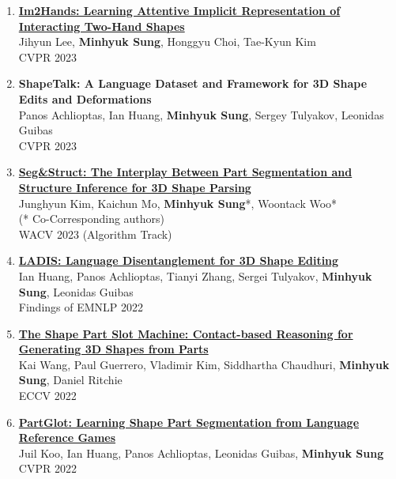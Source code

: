 \documentclass[letterpaper,10pt]{article} %
\newcommand{\blankline}{\quad\pagebreak[2]}
\begin{document}
\begin{enumerate}
\item \label{cvpr23_2}
\href{https://arxiv.org/abs/2302.14348}{\textbf{Im2Hands: Learning Attentive Implicit Representation of Interacting Two-Hand Shapes}}\\
Jihyun Lee, \textbf{Minhyuk Sung}, Honggyu Choi, Tae-Kyun Kim\\
CVPR 2023\\
\blankline

\item \label{cvpr23_1}
\textbf{ShapeTalk: A Language Dataset and Framework for 3D Shape Edits and Deformations}\\
Panos Achlioptas, Ian Huang, \textbf{Minhyuk Sung}, Sergey Tulyakov, Leonidas Guibas\\
CVPR 2023\\
\blankline

\item \label{wacv23}
\href{https://arxiv.org/abs/2212.05011}{\textbf{Seg\&Struct: The Interplay Between Part Segmentation and Structure Inference for 3D Shape Parsing}}\\
Junghyun Kim, Kaichun Mo, \textbf{Minhyuk Sung}*, Woontack Woo*\\
(* Co-Corresponding authors)\\
WACV 2023 (Algorithm Track)\\
\blankline

\item \label{emnlp22}
\href{https://arxiv.org/abs/2212.05011}{\textbf{LADIS: Language Disentanglement for 3D Shape Editing}}\\
Ian Huang, Panos Achlioptas, Tianyi Zhang, Sergei Tulyakov, \textbf{Minhyuk Sung}, Leonidas Guibas \\
Findings of EMNLP 2022\\
\blankline

\item \label{eccv22}
\href{https://arxiv.org/abs/2112.00584}{\textbf{The Shape Part Slot Machine: Contact-based Reasoning for Generating 3D Shapes from Parts}}\\
Kai Wang, Paul Guerrero, Vladimir Kim, Siddhartha Chaudhuri, \textbf{Minhyuk Sung}, Daniel Ritchie\\
ECCV 2022\\
\blankline

\item \label{cvpr22_3}
\href{https://arxiv.org/abs/2112.06390}{\textbf{PartGlot: Learning Shape Part Segmentation from Language Reference Games}}\\
Juil Koo, Ian Huang, Panos Achlioptas, Leonidas Guibas, \textbf{Minhyuk Sung}\\
CVPR 2022\\
\blankline


\end{enumerate}
\end{document}
